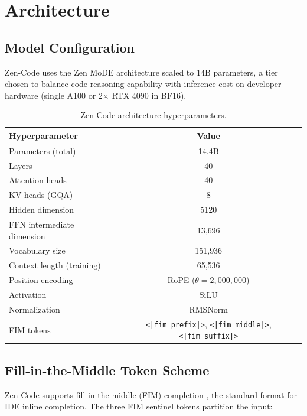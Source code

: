 \documentclass[11pt,a4paper]{article}
\begin{document}
\section{Architecture}

\subsection{Model Configuration}

Zen-Code uses the Zen MoDE architecture scaled to 14B parameters, a tier chosen to balance
code reasoning capability with inference cost on developer hardware (single A100 or 2$\times$
RTX 4090 in BF16).

\begin{table}[H]
\centering
\caption{Zen-Code architecture hyperparameters.}
\label{tab:arch}
\begin{tabular}{lc}
\toprule
\textbf{Hyperparameter} & \textbf{Value} \\
\midrule
Parameters (total)           & 14.4B \\
Layers                       & 40 \\
Attention heads              & 40 \\
KV heads (GQA)               & 8 \\
Hidden dimension             & 5120 \\
FFN intermediate dimension   & 13{,}696 \\
Vocabulary size              & 151{,}936 \\
Context length (training)    & 65{,}536 \\
Position encoding            & RoPE ($\theta = 2{,}000{,}000$) \\
Activation                   & SiLU \\
Normalization                & RMSNorm \\
FIM tokens                   & \texttt{<|fim\_prefix|>}, \texttt{<|fim\_middle|>}, \texttt{<|fim\_suffix|>} \\
\bottomrule
\end{tabular}
\end{table}

\subsection{Fill-in-the-Middle Token Scheme}

Zen-Code supports fill-in-the-middle (FIM) completion \cite{bavarian2022fim}, the standard
format for IDE inline completion. The three FIM sentinel tokens partition the input:
\end{document}
